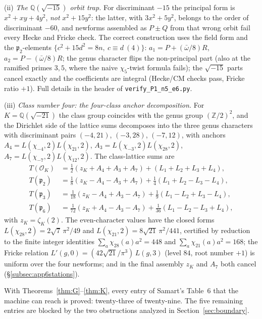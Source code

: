 \documentclass[11pt]{article}
\newcommand{\Qq}{\mathbb{Q}}
\newcommand{\Zz}{\mathbb{Z}}
\newcommand{\OO}{\mathcal{O}}
\theoremstyle{definition}
\theoremstyle{remark}
\begin{document}
(ii) \emph{The $\Qq(\sqrt{-15})$ orbit trap.} For discriminant $-15$
the principal form is $x^2+xy+4y^2$, \emph{not} $x^2+15y^2$: the
latter, with $3x^2+5y^2$, belongs to the order of discriminant
$-60$, and newforms assembled as $P\pm Q$ from that wrong orbit fail
every Hecke and Fricke check. The correct construction uses the
field form and the $\mathfrak p_2$-elements
$\{c^2+15d^2=8n,\ c\equiv d\ (4)\}$:
$a_1=P+(\bar\omega/8)R$, $a_2=P-(\bar\omega/8)R$; the genus
character flips the non-principal part (also at the ramified primes
$3,5$, where the naive $\chi_5$-twist formula fails); the
$\sqrt{-15}$ parts cancel exactly and the coefficients are integral
(Hecke/CM checks pass, Fricke ratio $+1$). Full details in the
header of \texttt{verify\_P1\_n5\_e6.py}.

(iii) \emph{Class number four: the four-class anchor decomposition.}
For $K=\Qq(\sqrt{-21})$ the class group coincides with the genus
group $(\Zz/2)^2$, and the Dirichlet side of the lattice sums
decomposes into the three genus characters with discriminant pairs
$(-4,21)$, $(-3,28)$, $(-7,12)$, with anchors
$A_4=L(\chi_{-4},2)L(\chi_{21},2)$,
$A_3=L(\chi_{-3},2)L(\chi_{28},2)$,
$A_7=L(\chi_{-7},2)L(\chi_{12},2)$. The class-lattice sums are
\begin{align*}
  T(\OO_K)&=\tfrac12(z_K+A_4+A_3+A_7)+(L_1+L_2+L_3+L_4),\\
  T(\mathfrak p_2)&=\tfrac18(z_K-A_4-A_3+A_7)
   +\tfrac14(L_1+L_2-L_3-L_4),\\
  T(\mathfrak p_3)&=\tfrac1{18}(z_K-A_4+A_3-A_7)
   +\tfrac19(L_1-L_2+L_3-L_4),\\
  T(\mathfrak p_6)&=\tfrac1{72}(z_K+A_4-A_3-A_7)
   +\tfrac1{36}(L_1-L_2-L_3+L_4),
\end{align*}
with $z_K=\zeta_K(2)$. The even-character values have the closed
forms $L(\chi_{28},2)=2\sqrt7\,\pi^2/49$ and
$L(\chi_{21},2)=8\sqrt{21}\,\pi^2/441$, certified by reduction to
the finite integer identities $\sum_a\chi_{28}(a)a^2=448$ and
$\sum_a\chi_{21}(a)a^2=168$; the Fricke relation
$L'(g,0)=(42\sqrt{21}/\pi^3)\,L(g,3)$ (level $84$, root number
$+1$) is uniform over the four newforms; and in the final assembly
$z_K$ and $A_7$ both cancel (\S\ref{subsec:app6stations}).

With Theorems~\ref{thm:G}--\ref{thm:K}, every entry of Samart's
Table~6 that the machine can reach is proved: twenty-three of
twenty-nine. The five remaining entries are blocked by the two
obstructions analyzed in Section~\ref{sec:boundary}.

\end{document}
